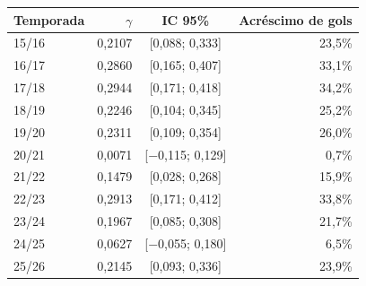 \begin{tabular}{lrcr}
  \toprule
  Temporada & $\gamma$ & IC 95\% & Acréscimo de gols \\
  \midrule
  15/16 & 0,2107 & [0,088; 0,333] & 23,5\% \\
  16/17 & 0,2860 & [0,165; 0,407] & 33,1\% \\
  17/18 & 0,2944 & [0,171; 0,418] & 34,2\% \\
  18/19 & 0,2246 & [0,104; 0,345] & 25,2\% \\
  19/20 & 0,2311 & [0,109; 0,354] & 26,0\% \\
  20/21 & 0,0071 & [$-$0,115; 0,129] & 0,7\% \\
  21/22 & 0,1479 & [0,028; 0,268] & 15,9\% \\
  22/23 & 0,2913 & [0,171; 0,412] & 33,8\% \\
  23/24 & 0,1967 & [0,085; 0,308] & 21,7\% \\
  24/25 & 0,0627 & [$-$0,055; 0,180] & 6,5\% \\
  25/26 & 0,2145 & [0,093; 0,336] & 23,9\% \\
  \bottomrule
\end{tabular}
